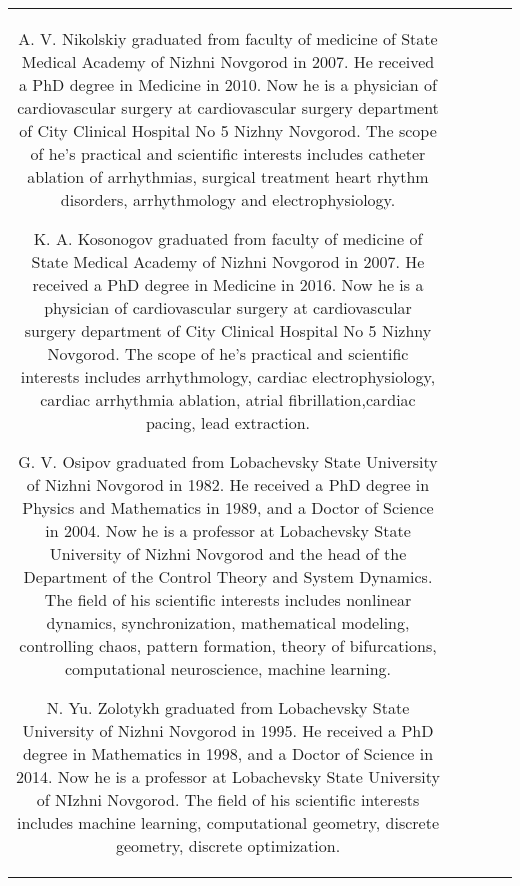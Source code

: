 \documentclass[submitted]{ieeeaccess}
\begin{document}
\begin{table}
\begin{tabular}{|c|c|c|c|c|}
\begin{IEEEbiography}[{\texttt{[image: Nikolskiy.jpg]}}]{A. V. Nikolskiy} graduated from faculty of medicine of State Medical Academy of Nizhni Novgorod in 2007. He received a PhD degree in Medicine in 2010. Now he is a physician of cardiovascular surgery at cardiovascular surgery department of City Clinical Hospital No 5 Nizhny Novgorod. The scope of he's practical and scientific interests includes catheter ablation of arrhythmias, surgical treatment heart rhythm disorders, arrhythmology and electrophysiology.  
\end{IEEEbiography}

\begin{IEEEbiography}[{\texttt{[image: Kosonogov.jpg]}}]{K. A. Kosonogov} graduated from faculty of medicine of State Medical Academy of Nizhni Novgorod in 2007. He received a PhD degree in Medicine in 2016. Now he is a physician of cardiovascular surgery at cardiovascular surgery department of City Clinical Hospital No 5 Nizhny Novgorod. The scope of he's practical and scientific interests includes arrhythmology, cardiac electrophysiology, cardiac arrhythmia ablation, atrial fibrillation,cardiac pacing, lead extraction. 
\end{IEEEbiography}



\begin{IEEEbiography}[{\texttt{[image: Osipov.jpg]}}]{G. V. Osipov} graduated from Lobachevsky State University of Nizhni Novgorod in 1982. He received a PhD degree in Physics and Mathematics in 1989, and a Doctor of Science in 2004. Now he is a professor at Lobachevsky State University of Nizhni Novgorod and the head of the Department of the Control Theory and System Dynamics. The field of his scientific interests includes nonlinear dynamics, synchronization, mathematical modeling,	controlling chaos, pattern formation, theory of bifurcations, computational neuroscience, machine learning.  
\end{IEEEbiography}


\begin{IEEEbiography}[{\texttt{[image: Zolotykh.jpg]}}]{N. Yu. Zolotykh} graduated from Lobachevsky State University of Nizhni Novgorod in 1995. He received a PhD degree in Mathematics in 1998, and a Doctor of Science in 2014. Now he is a professor at Lobachevsky State University of NIzhni Novgorod. The field of his scientific interests includes machine learning, computational geometry, discrete geometry, discrete optimization.  
\end{IEEEbiography}



\end{tabular}
\end{table}
\end{document}
